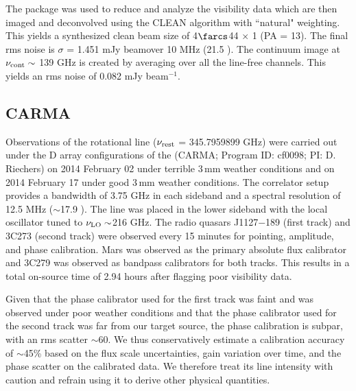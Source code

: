 \documentclass[]{emulateapj}
\begin{document}
The  package was used to reduce and analyze the visibility data
which are then imaged and deconvolved using the CLEAN algorithm with ``natural"
weighting. This yields a synthesized clean beam size of 4$\farcs$44 $\times$ 1 (PA = 13\degr).
The final rms noise is $\sigma$ = 1.451 mJy \kms
beam\pmOne over 10 MHz (21.5 \kms). The continuum image at $\nu_{\rm cont}\sim$
139 GHz is created by averaging over all the line-free channels. This
yields an rms noise of 0.082 mJy beam$^{-1}$. %

\subsection{CARMA \cco} %
Observations of the \cco rotational line ($\nu_{\rm rest}$ = 345.7959899 GHz)
were carried out under the D array configurations of the \carma (CARMA;
Program ID: cf0098; PI: D. Riechers) on 2014 February 02 under terrible 3\,mm
weather conditions and on 2014 February 17 under good 3\,mm
weather conditions. The correlator setup provides a bandwidth of 3.75 GHz in
each sideband and a spectral resolution of 12.5 MHz ($\sim$17.9 \kms). The
line was placed in the lower sideband with the local oscillator tuned to $\nu_{\rm LO}\sim$216 GHz. The radio quasars J1127$-$189 (first track) and 3C273
(second track) were observed
every 15 minutes for pointing, amplitude, and phase calibration. Mars was
observed as the primary absolute flux calibrator and 3C279 was observed as
bandpass calibrators for both tracks. This results in a total on-source time of 2.94 hours after flagging poor
visibility data.

%
Given that the phase calibrator used for the first track was faint and was
observed under poor weather conditions and that the phase calibrator used for
the second track was far from our target source, the phase calibration is
subpar, with an rms scatter $\sim$60\degr. We thus conservatively estimate
a calibration accuracy of $\sim$45\% based on the flux scale uncertainties,
gain variation over time, and the phase scatter on the calibrated data. We
therefore treat its line intensity with caution and refrain using it to derive other physical quantities.
\end{document}
